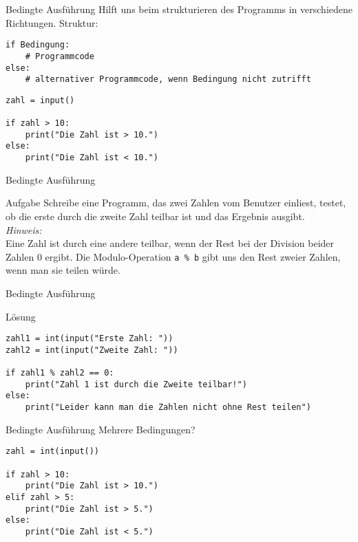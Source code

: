 \begin{frame}[fragile]{Bedingte Ausführung}
Hilft uns beim strukturieren des Programms in verschiedene Richtungen.
Struktur:

\begin{lstlisting}
if Bedingung:
    # Programmcode
else:
    # alternativer Programmcode, wenn Bedingung nicht zutrifft
\end{lstlisting}
\pause{}
\begin{lstlisting}
zahl = input()

if zahl > 10:
    print("Die Zahl ist > 10.")
else:
    print("Die Zahl ist < 10.")
\end{lstlisting}
\end{frame}

\begin{frame}[fragile]{Bedingte Ausführung}
    \begin{block}{Aufgabe}
        Schreibe eine Programm, das zwei Zahlen vom Benutzer einliest, testet, 
        ob die erste durch die zweite Zahl teilbar ist und das Ergebnis ausgibt.\\
        \pause{}
        \textit{Hinweis:}\\
        Eine Zahl ist durch eine andere teilbar, wenn der Rest bei der Division beider 
        Zahlen 0 ergibt. Die Modulo-Operation \texttt{a \% b} gibt uns den Rest zweier Zahlen, wenn man 
        sie teilen würde.
    \end{block}
\end{frame}

\begin{frame}[fragile]{Bedingte Ausführung}
    \begin{exampleblock}{Lösung}
        \begin{lstlisting}
zahl1 = int(input("Erste Zahl: "))
zahl2 = int(input("Zweite Zahl: "))

if zahl1 % zahl2 == 0:
    print("Zahl 1 ist durch die Zweite teilbar!")
else: 
    print("Leider kann man die Zahlen nicht ohne Rest teilen")
        \end{lstlisting}
    \end{exampleblock}
\end{frame}

\begin{frame}[fragile]{Bedingte Ausführung}
Mehrere Bedingungen?
\pause{}
\begin{lstlisting}
zahl = int(input())

if zahl > 10:
    print("Die Zahl ist > 10.")
elif zahl > 5:
    print("Die Zahl ist > 5.")
else:
    print("Die Zahl ist < 5.")

\end{lstlisting}
\end{frame}

